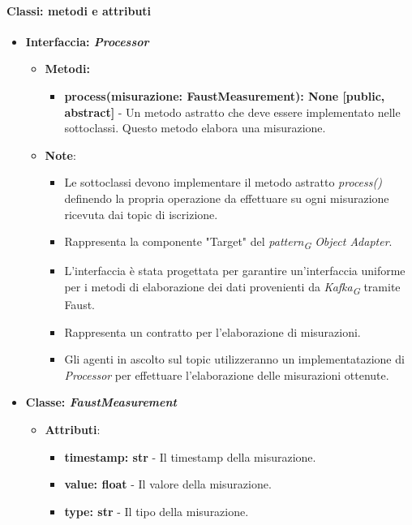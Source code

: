 \paragraph*{Classi: metodi e attributi}
\begin{itemize}
    \item{\textbf{Interfaccia: \textit{Processor}}}
    \begin{itemize}
    \item\textbf{Metodi: }
    \begin{itemize}
        \item \textbf{process(misurazione: FaustMeasurement): None [public, abstract]} - Un metodo astratto che deve essere implementato nelle sottoclassi. Questo metodo elabora una misurazione.
    \end{itemize}
    \item\textbf{Note}:
        \begin{itemize}
            \item  Le sottoclassi devono implementare il metodo astratto \textit{process()} definendo la propria operazione da effettuare su ogni misurazione ricevuta dai topic di iscrizione.
            \item Rappresenta la componente "Target" del \textit{pattern}\textsubscript{\textit{G}} \textit{Object Adapter}.
            \item L'interfaccia è stata progettata per garantire un'interfaccia uniforme per i metodi di elaborazione dei dati provenienti da \textit{Kafka}\textsubscript{\textit{G}} tramite Faust.
            \item Rappresenta un contratto per l'elaborazione di misurazioni.
            \item Gli agenti in ascolto sul topic utilizzeranno un implementatazione di \textit{Processor} per effettuare l'elaborazione delle misurazioni ottenute.
        \end{itemize}
    \end{itemize}
    \item{\textbf{Classe: \textit{FaustMeasurement}}}
    \begin{itemize}
    \item\textbf{Attributi}:
        \begin{itemize}
        \item \textbf{timestamp: str} - Il timestamp della misurazione.
        \item \textbf{value: float} - Il valore della misurazione.
        \item \textbf{type: str} - Il tipo della misurazione.

\end{itemize}
\end{itemize}
\end{itemize}
